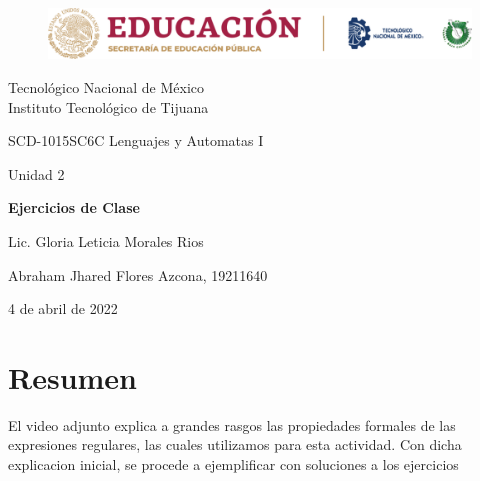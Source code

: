 \documentclass[stu, 12pt, letterpaper, donotrepeattitle, floatsintext, natbib]{apa7}
\begin{document}
    \begin{titlepage}
        \begin{figure}[ht]
            \centering
            \includegraphics[width=15cm]{logosITT.png}
        \end{figure}
        \centering
        {\Large Tecnológico Nacional de México\\Instituto Tecnológico de Tijuana\par}
        \vspace{1cm}
        {\Large SCD-1015SC6C Lenguajes y Automatas I\par}
        \vspace{1cm}
        {\Large Unidad 2\par}
        \vspace{1.5cm}
        {\Large\bfseries Ejercicios de Clase\par}
        \vspace{2cm}
        {\large Lic. Gloria Leticia Morales Rios\par}
        \vfill
            {\large Abraham Jhared Flores Azcona, 19211640\par}
        \vfill
        {\large 4 de abril de 2022}
    \end{titlepage}


\newpage
\section*{Resumen}
\begin{justifying}
El video adjunto explica a grandes rasgos las propiedades formales de las expresiones regulares, las cuales utilizamos
para esta actividad. Con dicha explicacion inicial, se procede a ejemplificar con soluciones a los ejercicios\par
\end{justifying}
\vspace{\baselineskip}
\end{document}
